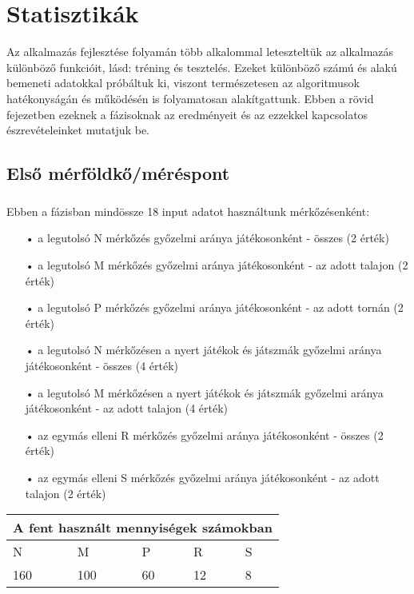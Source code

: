 \chapter{Statisztikák}\label{ch:MAT}

\begin{osszefoglal}
	Az alkalmazás fejlesztése folyamán több alkalommal leteszteltük az alkalmazás különböző funkcióit, lásd: tréning és tesztelés. Ezeket különböző számú és alakú bemeneti adatokkal próbáltuk ki, viszont természetesen az algoritmusok hatékonyságán és működésén is folyamatosan alakítgattunk. Ebben a rövid fejezetben ezeknek a fázisoknak az eredményeit és az ezzekkel kapcsolatos észrevételeinket mutatjuk be.
\end{osszefoglal}


\section{Első mérföldkő/méréspont}\label{sec:MAT:bev}
\paragraph{}
Ebben a fázisban mindössze 18 input adatot használtunk mérkőzésenként:
\begin{enumerate}
\item[•] a legutolsó N mérkőzés győzelmi aránya játékosonként - összes (2 érték)
\item[•] a legutolsó M mérkőzés győzelmi aránya játékosonként - az adott talajon (2 érték)
\item[•] a legutolsó P mérkőzés győzelmi aránya játékosonként - az adott tornán (2 érték)
\item[•] a legutolsó N mérkőzésen a nyert játékok és játszmák győzelmi aránya játékosonként - összes (4 érték)
\item[•] a legutolsó M mérkőzésen a nyert játékok és játszmák győzelmi aránya játékosonként - az adott talajon (4 érték)
\item[•] az egymás elleni R mérkőzés győzelmi aránya játékosonként - összes (2 érték)
\item[•] az egymás elleni S mérkőzés győzelmi aránya játékosonként - az adott talajon (2 érték)
\end{enumerate}

\begin{center}
\begin{tabular}{ |p{2cm}|p{2cm}|p{2cm}|p{2cm}|p{2cm}|  }
 \hline
 \multicolumn{5}{|c|}{A fent használt mennyiségek számokban} \\
 \hline
  N & M & P & R & S\\
 \hline
 160 & 100 & 60 & 12 & 8 \\
 \hline
\end{tabular}
\end{center}

